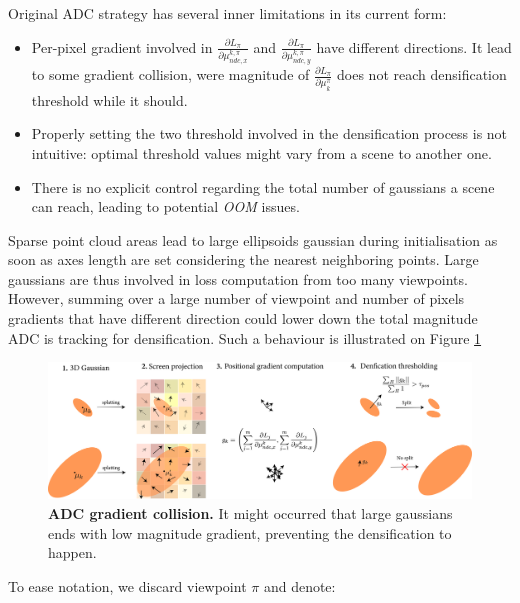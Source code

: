 Original \ac{ADC} strategy has several inner limitations in its current form: 
\begin{itemize}
    \item Per-pixel gradient involved in $\frac{\partial L_{\pi}}{\partial \mu^{k,\pi}_{ndc,x}}$ and $\frac{\partial L_{\pi}}{\partial \mu^{k,\pi}_{ndc,y}}$  have different directions. It lead to some gradient collision, were magnitude of $\frac{\partial L_{\pi}}{\partial \mu_{k}^{\pi}}$ does not reach densification threshold while it should. 
    \item Properly setting the two threshold involved in the densification process is not intuitive: optimal threshold values might vary from a scene to another one. 
    \item There is no explicit control regarding the total number of gaussians a scene can reach, leading to potential \textit{OOM} issues.
\end{itemize}

Sparse point cloud areas lead to large ellipsoids gaussian during initialisation as soon as axes length are set considering the nearest neighboring points. Large gaussians are thus involved in loss computation from too many viewpoints. However, summing over a large number of viewpoint and  number of pixels gradients that have different direction could lower down the total magnitude \ac{ADC} is tracking for densification. Such a behaviour is illustrated on Figure \ref{fig:adc-limitation}



\begin{figure}[htbp!]
    \center
  \includegraphics[width=\linewidth]{images/gaussiansplatting/adc_limitation.png}
  \caption{\textbf{ADC gradient collision.} It might occurred that large gaussians ends with low magnitude gradient, preventing the densification to happen.}
  \label{fig:adc-limitation}
\end{figure}



To ease notation, we discard viewpoint $\pi$ and denote: 


